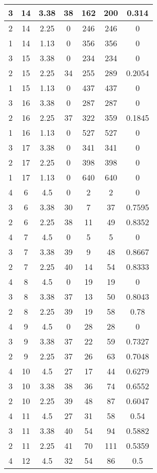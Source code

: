 \documentclass[letterpaper, 12pt]{article}
\begin{document}
\begin{longtable}{|c|c|c|c|c|c|c|}
\hline
3 & 14 & 3.38 & 38 & 162 & 200 & 0.314 \\
\hline
2 & 14 & 2.25 & 0 & 246 & 246 & 0 \\
\hline
1 & 14 & 1.13 & 0 & 356 & 356 & 0 \\
\hline
3 & 15 & 3.38 & 0 & 234 & 234 & 0 \\
\hline
2 & 15 & 2.25 & 34 & 255 & 289 & 0.2054 \\
\hline
1 & 15 & 1.13 & 0 & 437 & 437 & 0 \\
\hline
3 & 16 & 3.38 & 0 & 287 & 287 & 0 \\
\hline
2 & 16 & 2.25 & 37 & 322 & 359 & 0.1845 \\
\hline
1 & 16 & 1.13 & 0 & 527 & 527 & 0 \\
\hline
3 & 17 & 3.38 & 0 & 341 & 341 & 0 \\
\hline
2 & 17 & 2.25 & 0 & 398 & 398 & 0 \\
\hline
1 & 17 & 1.13 & 0 & 640 & 640 & 0 \\
\hline
4 & 6 & 4.5 & 0 & 2 & 2 & 0 \\
\hline
3 & 6 & 3.38 & 30 & 7 & 37 & 0.7595 \\
\hline
2 & 6 & 2.25 & 38 & 11 & 49 & 0.8352 \\
\hline
4 & 7 & 4.5 & 0 & 5 & 5 & 0 \\
\hline
3 & 7 & 3.38 & 39 & 9 & 48 & 0.8667 \\
\hline
2 & 7 & 2.25 & 40 & 14 & 54 & 0.8333 \\
\hline
4 & 8 & 4.5 & 0 & 19 & 19 & 0 \\
\hline
3 & 8 & 3.38 & 37 & 13 & 50 & 0.8043 \\
\hline
2 & 8 & 2.25 & 39 & 19 & 58 & 0.78 \\
\hline
4 & 9 & 4.5 & 0 & 28 & 28 & 0 \\
\hline
3 & 9 & 3.38 & 37 & 22 & 59 & 0.7327 \\
\hline
2 & 9 & 2.25 & 37 & 26 & 63 & 0.7048 \\
\hline
4 & 10 & 4.5 & 27 & 17 & 44 & 0.6279 \\
\hline
3 & 10 & 3.38 & 38 & 36 & 74 & 0.6552 \\
\hline
2 & 10 & 2.25 & 39 & 48 & 87 & 0.6047 \\
\hline
4 & 11 & 4.5 & 27 & 31 & 58 & 0.54 \\
\hline
3 & 11 & 3.38 & 40 & 54 & 94 & 0.5882 \\
\hline
2 & 11 & 2.25 & 41 & 70 & 111 & 0.5359 \\
\hline
4 & 12 & 4.5 & 32 & 54 & 86 & 0.5 \\

\end{longtable}
\end{document}
